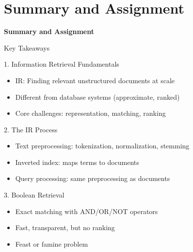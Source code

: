 \documentclass[aspectratio=169]{beamer}
\newif\ifanimated
\newcommand{\cpause}{\ifanimated\pause\fi}
\begin{document}
\section{Summary and Assignment}
\begin{frame}
  \centering
  \LARGE \textbf{Summary and Assignment}
\end{frame}


\begin{frame}[shrink=5]{Key Takeaways}
\begin{block}{1. Information Retrieval Fundamentals}
\begin{itemize}
    \item IR: Finding relevant unstructured documents at scale
    \item Different from database systems (approximate, ranked)
    \item Core challenges: representation, matching, ranking
\end{itemize}
\cpause
\end{block}
\cpause
\begin{block}{2. The IR Process}
\begin{itemize}
    \item Text preprocessing: tokenization, normalization, stemming
    \item Inverted index: maps terms to documents
    \item Query processing: same preprocessing as documents
\end{itemize}
\cpause
\end{block}
\cpause
\begin{block}{3. Boolean Retrieval}
\begin{itemize}
    \item Exact matching with AND/OR/NOT operators
    \item Fast, transparent, but no ranking
    \item Feast or famine problem
\end{itemize}
\end{block}
\end{frame}
\end{document}
